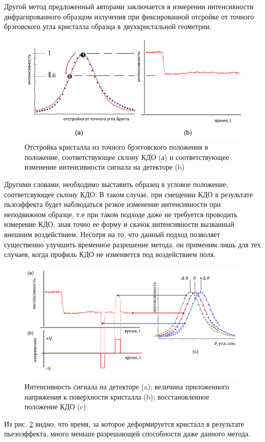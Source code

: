 \label{sec:slope_diff_piezo}
Другой метод предложенный авторами \cite{piezo50} заключается в измерении интенсивности
дифрагированного образцом излучения при фиксированной отсройке от точного
брэговского угла кристалла образца в двухкристальной геометрии.

\begin{figure}[H]
\centering
\includegraphics[width=1\linewidth]{images/kdopiez2.png}
\caption{Отстройка кристалла из точного брэгговского положения в положение,
соответствующее склону КДО (а) и соответствующее изменение интенсивности сигнала на детекторе (b)}
\label{ris:kdopiez}
\end{figure}
\noindent
Другими словами, необходимо выставить образец в угловое положение, соответсвующее склону КДО.
В таком случае, при смещении КДО в результате пьзоэффекта будет наблюдаться резкое изменение
интенсивности при неподвижном образце, т.е при таком подходе даже не требуется проводить
измерение КДО, зная точно ее форму и скачок интенсивности вызванный внешним воздействием.
Несотря на то, что данный подход позволяет существенно улучшить временное разрешение метода,
он применим лишь для тех случаев, когда профиль КДО не изменяется под воздействием поля.

\begin{figure}[H]
\centering
\includegraphics[width=0.8\linewidth]{images/princip2.png}
\caption{Интенсивность сигнала на детекторе (a); величина  приложенного напряжения к
поверхности кристалла (b); восстановленное положение КДО (c)}
\label{ris:princip}
\end{figure}

Из рис. \ref{ris:princip}  видно, что время, за которое деформируется кристалл
в результате пьезоэффекта, много меньше разрешающей способности даже данного метода.
